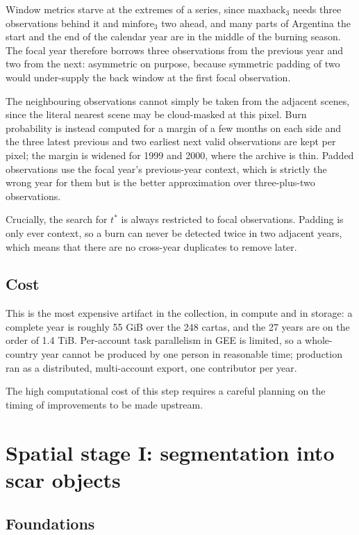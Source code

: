 \documentclass[11pt,a4paper]{article}
\begin{document}
Window metrics starve at the extremes of a series, since \(\mathrm{maxback}_3\) needs three
observations behind it and \(\mathrm{minfore}_3\) two ahead, and many parts of Argentina the start
and the end of the calendar year are in the middle of the burning season. The focal year therefore
borrows three observations from the previous year and two from the next: asymmetric on purpose,
because symmetric padding of two would under-supply the back window at the first focal observation.

The neighbouring observations cannot simply be taken from the adjacent scenes, since the literal
nearest scene may be cloud-masked at this pixel. Burn probability is instead computed for a margin
of a few months on each side and the three latest previous and two earliest next valid
observations are kept per pixel; the margin is widened for 1999 and 2000, where the archive is
thin. Padded observations use the focal year's previous-year context, which is strictly the wrong
year for them but is the better approximation over three-plus-two observations.

Crucially, the search for \(t^{*}\) is always restricted to focal observations. Padding is only
ever context, so a burn can never be detected twice in two adjacent years, which means that
there are no cross-year duplicates to remove later.

\subsection{Cost}

This is the most expensive artifact in the collection, in compute and in storage: a complete year
is roughly 55 GiB over the 248 cartas, and the 27 years are on the order of 1.4 TiB. Per-account
task parallelism in GEE is limited, so a whole-country year cannot be produced by one person in
reasonable time; production ran as a distributed, multi-account export, one contributor per year.

The high computational cost of this step requires a careful planning on the timing of improvements
to be made upstream.

\section{Spatial stage I: segmentation into scar objects}\label{sec-snic}

\subsection{Foundations}
\end{document}

